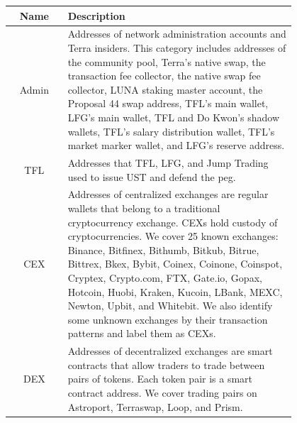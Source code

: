 \begin{tabular}{|c|p{0.8\linewidth}|}
    \hline
    Name   & Description                                                                                                                                                                                                                                                                                                                                                                                                                                                                                 \\
    \hline
    Admin  & Addresses of network administration accounts and Terra insiders. This category includes addresses of the community pool, Terra’s native swap, the transaction fee collector, the native swap fee collector, LUNA staking master account, the Proposal 44 swap address, TFL's main wallet, LFG's main wallet, TFL and Do Kwon's shadow wallets, TFL's salary distribution wallet, TFL's market marker wallet, and LFG's reserve address.                                                     \\ \hline
    TFL    & Addresses that TFL, LFG, and Jump Trading used to issue UST and defend the peg.                                                                                                                                                                                                                                                                                                                                                                                                                     \\ \hline
    CEX    & Addresses of centralized exchanges are regular wallets that belong to a traditional cryptocurrency exchange. CEXs hold custody of cryptocurrencies. We cover 25 known exchanges: Binance, Bitfinex, Bithumb, Bitkub, Bitrue, Bittrex, Bkex, Bybit, Coinex, Coinone, Coinspot, Cryptex, Crypto.com, FTX, Gate.io, Gopax, Hotcoin, Huobi, Kraken, Kucoin, LBank, MEXC, Newton, Upbit, and Whitebit. We also identify some unknown exchanges by their transaction patterns and label them as CEXs. \\ \hline
    DEX    & Addresses of decentralized exchanges are smart contracts that allow traders to trade between pairs of tokens. Each token pair is a smart contract address. We cover trading pairs on Astroport, Terraswap, Loop, and Prism.                                                                                                                                                                                                                                                                 \\ \hline

\end{tabular}
